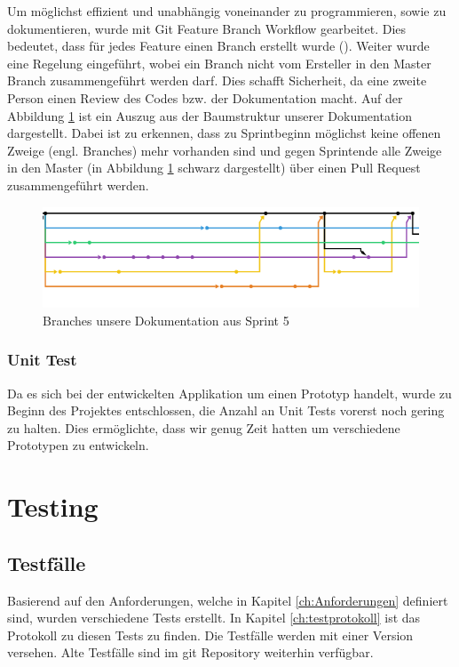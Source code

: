 \documentclass[a4paper]{scrreprt}
\begin{document}
Um möglichst effizient und unabhängig voneinander zu programmieren, sowie zu dokumentieren, wurde mit Git Feature Branch Workflow gearbeitet. Dies bedeutet, dass für jedes Feature einen Branch erstellt wurde (\cite{gitFeatureBranchWorkflow}). Weiter wurde eine Regelung eingeführt, wobei ein Branch nicht vom Ersteller in den Master Branch zusammengeführt werden darf. Dies schafft Sicherheit, da eine zweite Person einen Review des Codes bzw. der Dokumentation macht.
Auf der Abbildung \ref{fig:FeatureBranchWorkflow} ist ein Auszug aus der Baumstruktur unserer Dokumentation dargestellt. Dabei ist zu erkennen, dass zu Sprintbeginn möglichst keine offenen Zweige (engl. Branches) mehr vorhanden sind und gegen Sprintende alle Zweige in den Master (in Abbildung \ref{fig:FeatureBranchWorkflow} schwarz dargestellt) über einen Pull Request zusammengeführt werden.

\begin{figure}[h!]
	\center
	\includegraphics[width=\textwidth]{GitFeatureBranchWorkflow.png}
	\caption{Branches unsere Dokumentation aus Sprint 5}
	\label{fig:FeatureBranchWorkflow}
\end{figure}

\subsubsection{Unit Test}
Da es sich bei der entwickelten Applikation um einen Prototyp handelt, wurde zu Beginn des Projektes entschlossen, die Anzahl an Unit Tests vorerst noch gering zu halten. Dies ermöglichte, dass wir genug Zeit hatten um verschiedene Prototypen zu entwickeln.

\section{Testing}

\subsection{Testfälle}
Basierend auf den Anforderungen, welche in Kapitel \ref{ch:Anforderungen} definiert sind, wurden verschiedene Tests erstellt. In Kapitel \ref{ch:testprotokoll} ist das Protokoll zu diesen Tests zu finden. Die Testfälle werden mit einer Version versehen. Alte Testfälle sind im git Repository weiterhin verfügbar.
\end{document}
